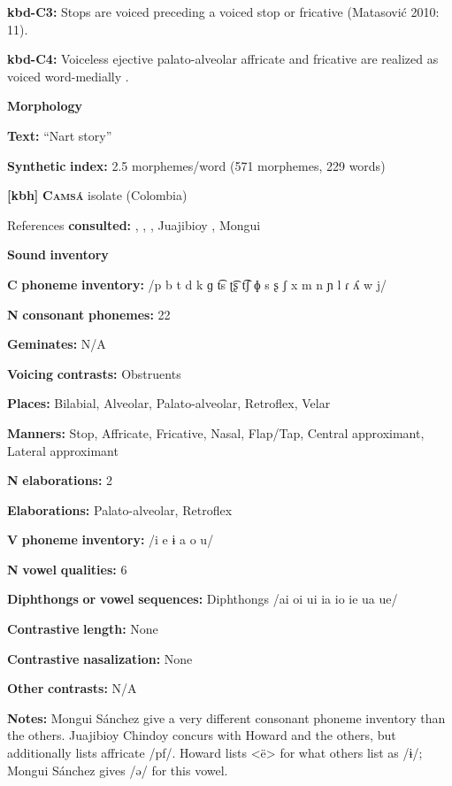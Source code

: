 \begin{styleBody}
\textbf{kbd-C3:} Stops are voiced preceding a voiced stop or fricative (Matasović 2010: 11).

\textbf{kbd-C4:} Voiceless ejective palato-alveolar affricate and fricative are realized as voiced word-medially \citep[19]{Kuipers1960}.

\textbf{Morphology}

\textbf{Text:} “Nart story” \citep[223-231]{Applebaum2013}

\textbf{Synthetic} \textbf{index:} 2.5 morphemes/word (571 morphemes, 229 words)

\textbf{[kbh]}   \textbf{\textsc{Camsá}}  isolate (Colombia)

References \textbf{consulted:} \citet{Fabre2002}, \citet{Howard1967}, \citet{Howard1972}, Juajibioy \citet{Chindoy1962}, Mongui \citet{Sánchez1981}

\textbf{Sound} \textbf{inventory}

\textbf{C} \textbf{phoneme} \textbf{inventory:} /p b t d k ɡ t͡s ʈ͡ʂ t͡ʃ ɸ s ʂ ʃ x m n ɲ l ɾ ʎ w j/

\textbf{N} \textbf{consonant} \textbf{phonemes:} 22

\textbf{Geminates:} N/A

\textbf{Voicing} \textbf{contrasts:} Obstruents

\textbf{Places:} Bilabial, Alveolar, Palato-alveolar, Retroflex, Velar

\textbf{Manners:} Stop, Affricate, Fricative, Nasal, Flap/Tap, Central approximant, Lateral approximant

\textbf{N} \textbf{elaborations:} 2

\textbf{Elaborations:} Palato-alveolar, Retroflex

\textbf{V} \textbf{phoneme} \textbf{inventory:} /i e ɨ a o u/

\textbf{N} \textbf{vowel} \textbf{qualities:} 6

\textbf{Diphthongs} \textbf{or} \textbf{vowel} \textbf{sequences:} Diphthongs /ai oi ui ia io ie ua ue/

\textbf{Contrastive} \textbf{length:} None

\textbf{Contrastive} \textbf{nasalization:} None

\textbf{Other} \textbf{contrasts:} N/A

\textbf{Notes:} Mongui Sánchez give a very different consonant phoneme inventory than the others. Juajibioy Chindoy concurs with Howard and the others, but additionally lists affricate /pf/. Howard lists <ë> for what others list as /ɨ/; Mongui Sánchez gives /ə/ for this vowel.


\end{styleBody}
